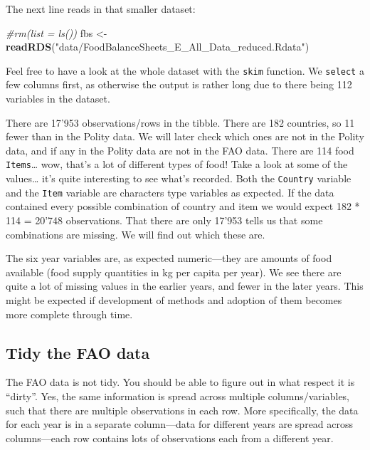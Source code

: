 \documentclass[]{book}
\newenvironment{Shaded}{\begin{snugshade}}{\end{snugshade}}
\newcommand{\CommentTok}[1]{\textcolor[rgb]{0.56,0.35,0.01}{\textit{#1}}}
\newcommand{\KeywordTok}[1]{\textcolor[rgb]{0.13,0.29,0.53}{\textbf{#1}}}
\newcommand{\NormalTok}[1]{#1}
\newcommand{\StringTok}[1]{\textcolor[rgb]{0.31,0.60,0.02}{#1}}
\begin{document}
The next line reads in that smaller dataset:

\begin{Shaded}
\begin{Highlighting}[]
\CommentTok{#rm(list = ls())}
\NormalTok{fbs <-}\StringTok{ }\KeywordTok{readRDS}\NormalTok{(}\StringTok{"data/FoodBalanceSheets_E_All_Data_reduced.Rdata"}\NormalTok{)}
\end{Highlighting}
\end{Shaded}

Feel free to have a look at the whole dataset with the \texttt{skim} function. We \texttt{select} a few columns first, as otherwise the output is rather long due to there being 112 variables in the dataset.

\begin{Shaded}
\end{Shaded}

There are 17'953 observations/rows in the tibble. There are 182 countries, so 11 fewer than in the Polity data. We will later check which ones are not in the Polity data, and if any in the Polity data are not in the FAO data. There are 114 food \texttt{Items}\ldots{} wow, that's a lot of different types of food! Take a look at some of the values\ldots{} it's quite interesting to see what's recorded. Both the \texttt{Country} variable and the \texttt{Item} variable are characters type variables as expected. If the data contained every possible combination of country and item we would expect 182 * 114 = 20'748 observations. That there are only 17'953 tells us that some combinations are missing. We will find out which these are.

The six year variables are, as expected numeric---they are amounts of food available (food supply quantities in kg per capita per year). We see there are quite a lot of missing values in the earlier years, and fewer in the later years. This might be expected if development of methods and adoption of them becomes more complete through time.

\hypertarget{tidying-FAO}{%
\subsection{Tidy the FAO data}\label{tidying-FAO}}

The FAO data is not tidy. You should be able to figure out in what respect it is ``dirty''. Yes, the same information is spread across multiple columns/variables, such that there are multiple observations in each row. More specifically, the data for each year is in a separate column---data for different years are spread across columns---each row contains lots of observations each from a different year.
\end{document}
